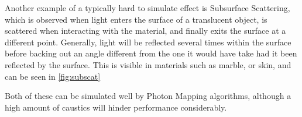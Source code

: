 \documentclass[main.tex]{subfiles}
\begin{document}

Another example of a typically hard to simulate effect is Subsurface Scattering, which is observed when light enters the surface of a translucent object, is scattered when interacting with the material, and finally exits the surface at a different point. Generally, light will be reflected several times within the surface before backing out an angle different from the one it would have take had it been reflected by the surface. This is visible in materials such as marble, or skin, and can be seen in \cref{fig:subscat}


Both of these can be simulated well by Photon Mapping algorithms, although a high amount of caustics will hinder performance considerably.
\end{document}
